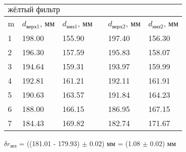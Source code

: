 \documentclass[a4paper, 12pt]{article}
\begin{document}
\begin{table}[h]
\centering
\begin{tabular}{|llllll|}
\hline
\multicolumn{6}{|l|}{$\text{жёлтый фильтр}$}                                                                                                                                                                                       \\ \hline
\multicolumn{1}{|l|}{m} & \multicolumn{1}{l|}{$d_{\text{верх} 1}$, мм} & \multicolumn{1}{l|}{$d_{\text{низ}1}$, мм} & \multicolumn{1}{l|}{} & \multicolumn{1}{l|}{$d_{\text{верх}2}$, мм} & $d_{\text{низ}2}$, мм \\ \cline{1-3} \cline{5-6} 
\multicolumn{1}{|l|}{1} & \multicolumn{1}{l|}{198.00}                  & \multicolumn{1}{l|}{155.90}                & \multicolumn{1}{l|}{}                  & \multicolumn{1}{l|}{197.40}                 & 156.30                \\ \cline{1-3} \cline{5-6} 
\multicolumn{1}{|l|}{2} & \multicolumn{1}{l|}{196.30}                  & \multicolumn{1}{l|}{157.59}                & \multicolumn{1}{l|}{}                  & \multicolumn{1}{l|}{195.83}                 & 158.07                \\ \cline{1-3} \cline{5-6} 
\multicolumn{1}{|l|}{3} & \multicolumn{1}{l|}{194.64}                  & \multicolumn{1}{l|}{159.31}                & \multicolumn{1}{l|}{}                  & \multicolumn{1}{l|}{193.97}                 & 159.99                \\ \cline{1-3} \cline{5-6} 
\multicolumn{1}{|l|}{4} & \multicolumn{1}{l|}{192.81}                  & \multicolumn{1}{l|}{161.21}                & \multicolumn{1}{l|}{}                  & \multicolumn{1}{l|}{192.11}                 & 161.91                \\ \cline{1-3} \cline{5-6} 
\multicolumn{1}{|l|}{5} & \multicolumn{1}{l|}{190.63}                  & \multicolumn{1}{l|}{163.57}                & \multicolumn{1}{l|}{}                  & \multicolumn{1}{l|}{191.84}                 & 164.23                \\ \cline{1-3} \cline{5-6} 
\multicolumn{1}{|l|}{6} & \multicolumn{1}{l|}{188.00}                  & \multicolumn{1}{l|}{166.15}                & \multicolumn{1}{l|}{}                  & \multicolumn{1}{l|}{186.95}                 & 167.15                \\ \cline{1-3} \cline{5-6} 
\multicolumn{1}{|l|}{7} & \multicolumn{1}{l|}{184.43}                  & \multicolumn{1}{l|}{169.82}                & \multicolumn{1}{l|}{}                  & \multicolumn{1}{l|}{182.74}                 & 171.67                \\ \hline
\end{tabular}
\end{table}
\newpage
$\delta r_{\text{зел}}$ = ((181.01 - 179.93) $\pm$ 0.02) мм = (1.08 $\pm$ 0.02) мм
\par
\end{document}
